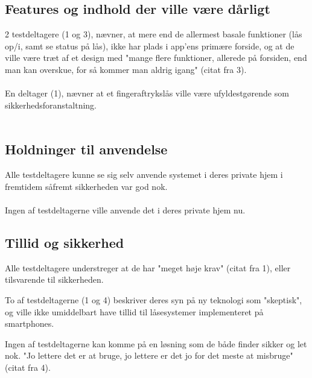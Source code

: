\documentclass[a4paper,12pt]{article}
\begin{document}
\subsection{Features og indhold der ville være dårligt}
2 testdeltagere (1 og 3), nævner, at mere end de allermest basale funktioner (lås op/i, samt se status på lås), ikke har plads i app'ens primære forside, og at de ville være træt af et design med "mange flere funktioner, allerede på forsiden, end man kan overskue, for så kommer man aldrig igang" (citat fra 3).
\\ \\
En deltager (1), nævner at et fingeraftrykslås ville være ufyldestgørende som sikkerhedsforanstaltning.
\\ \\

\subsection{Holdninger til anvendelse}
Alle testdeltagere kunne se sig selv anvende systemet i deres private hjem i fremtidem såfremt sikkerheden var god nok. 
\\ \\
Ingen af testdeltagerne ville anvende det i deres private hjem nu.
\subsection{Tillid og sikkerhed}

Alle testdeltagere understreger at de har "meget høje krav" (citat fra 1), eller tilsvarende til sikkerheden.

To af testdeltagerne (1 og 4) beskriver deres syn på ny teknologi som "skeptisk", og ville ikke umiddelbart have tillid til låsesystemer implementeret på smartphones.

Ingen af testdeltagerne kan komme på en løsning som de både finder sikker og let nok. "Jo lettere det er at bruge, jo lettere er det jo for det meste at misbruge" (citat fra 4).
\end{document}
